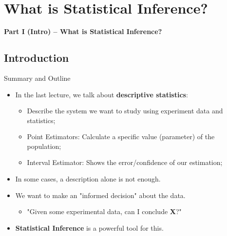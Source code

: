 \section{What is Statistical Inference?}

\begin{frame}
  \begin{center}
    {\bf Part I (Intro) -- What is Statistical Inference?}
  \end{center}
\end{frame}

\subsection{Introduction}
\begin{frame}{Summary and Outline}
  \begin{itemize}
    \item In the last lecture, we talk about {\bf descriptive statistics}:
    \begin{itemize}
      \item Describe the system we want to study using experiment data and statistics;
      \item Point Estimators: Calculate a specific value (parameter) of the population;
      \item Interval Estimator: Shows the error/confidence of our estimation;
    \end{itemize}\bigskip

    \item In some cases, a description alone is not enough.
    \item We want to make an "informed decision" about the data.
    \begin{itemize}
      \item "Given some experimental data, can I conclude {\bf X}?"

    \end{itemize}\bigskip

    \item {\bf Statistical Inference} is a powerful tool for this.
  \end{itemize}
\end{frame}

